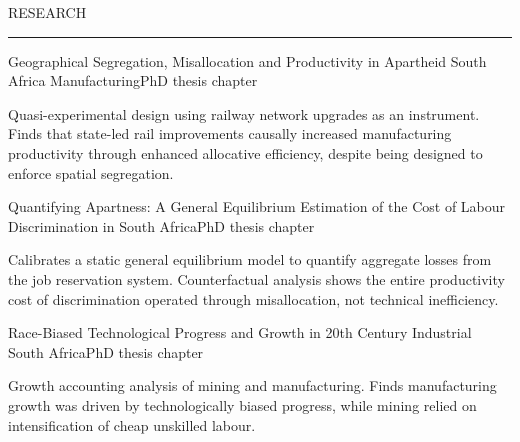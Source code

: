 \documentclass{resume} %
\renewenvironment{rSection}[1]{
\sectionskip
\textcolor{RoyalPurple}{\MakeUppercase{#1}}
\sectionlineskip
\hrule
\begin{list}{}{
\setlength{\leftmargin}{1.5em}
}
\item[]
}{
\end{list}
}
\begin{document}
\begin{rSection}{Research}


\begin{rSubsection}{Geographical Segregation, Misallocation and Productivity in Apartheid South Africa Manufacturing}{}{PhD thesis chapter}{}
\item Quasi-experimental design using railway network upgrades as an instrument. Finds that state-led rail improvements causally increased manufacturing productivity through enhanced allocative efficiency, despite being designed to enforce spatial segregation.
\end{rSubsection}

\begin{rSubsection}{Quantifying Apartness: A General Equilibrium Estimation of the Cost of Labour Discrimination in South Africa}{}{PhD thesis chapter}{}
\item Calibrates a static general equilibrium model to quantify aggregate losses from the job reservation system. Counterfactual analysis shows the entire productivity cost of discrimination operated through misallocation, not technical inefficiency.
\end{rSubsection}

\begin{rSubsection}{Race-Biased Technological Progress and Growth in 20th Century Industrial South Africa}{}{PhD thesis chapter}{}
\item Growth accounting analysis of mining and manufacturing. Finds manufacturing growth was driven by technologically biased progress, while mining relied on intensification of cheap unskilled labour.
\end{rSubsection}

\end{rSection}

\end{document}
